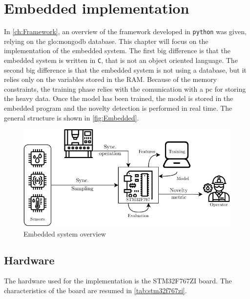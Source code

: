 \chapter{Embedded implementation}
\label{ch:Embedded}
In \autoref{ch:Framework}, an overview of the framework developed in \texttt{python} was given, relying on the \gls{glo:mongodb} database. This chapter will focus on the implementation of the embedded system. The first big difference is that the embedded system is written in \texttt{C}, that is not an object oriented language. The second big difference is that the embedded system is not using a database, but it relies only on the variables stored in the RAM. Because of the memory constraints, the training phase relies with the comunication with a \gls{pc} for storing the heavy data. Once the model has been trained, the model is stored in the embedded program and the novelty detection is performed in real time. The general structure is shown in \autoref{fig:Embedded}.

\begin{figure}
    \centering
    \includegraphics[scale=1]{images/Embedded/EmbeddedStructure.pdf}
    \caption{Embedded system overview}
    \label{fig:Embedded}
\end{figure}


\section{Hardware}
The hardware used for the implementation is the STM32F767ZI board. The characteristics of the board are resumed in \autoref{tab:stm32f767zi}.


